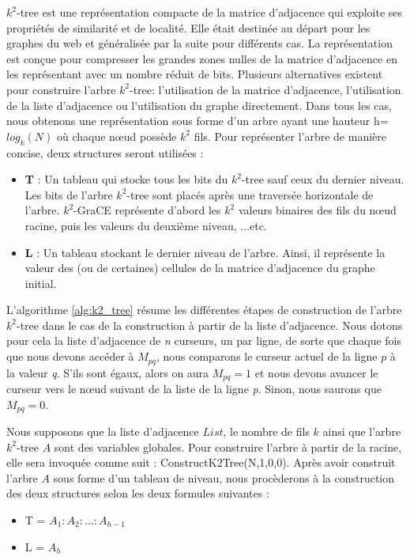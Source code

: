 \documentclass[a4paper,oneside,12pt]{report}
\theoremstyle{definition}
\begin{document}
			$k^2$-tree est une représentation compacte de la matrice d'adjacence qui exploite ses propriétés de similarité et de localité. Elle était destinée au départ pour les graphes du web et généralisée par la suite pour différents cas. La représentation est conçue pour compresser les grandes zones nulles de la matrice d'adjacence en les représentant avec un nombre réduit de bits. Plusieurs alternatives existent pour construire l'arbre $k^2$-tree: l'utilisation de la matrice d'adjacence, l'utilisation de la liste d'adjacence ou l'utilisation du graphe directement. Dans tous les cas, nous obtenons une représentation sous forme d'un arbre ayant une hauteur h= $log_k(N)$ où chaque nœud possède $k^2$ fils. 
			  Pour représenter l'arbre de manière concise, deux structures seront utilisées :
			\begin{itemize}
			\item \textbf{T }: Un tableau qui stocke tous les bits du $k^2$-tree sauf ceux du dernier niveau. Les bits de l'arbre $k^2$-tree sont placés après une traversée horizontale de l'arbre. $k^2$-GraCE représente d'abord les $k^2$ valeurs binaires des fils du nœud racine, puis les valeurs du deuxième niveau, ...etc.
			
			\item  \textbf{L} : Un tableau stockant le dernier niveau de l'arbre. Ainsi, il représente la valeur des (ou de certaines) cellules de la matrice d'adjacence du graphe initial.
			\end{itemize}
			
			L'algorithme \ref{alg:k2_tree} résume les différentes étapes de construction de l'arbre $k^2$-tree dans le cas de la construction à partir de la liste d'adjacence. Nous dotons pour cela la liste d'adjacence de \textit{n} curseurs, un par ligne, de sorte que chaque fois que nous devons accéder à $M_{pq}$, nous comparons le curseur actuel de la ligne $p$ à la valeur \textit{q}. S'ils sont égaux, alors on aura $M_{pq} = 1$ et nous devons avancer le curseur vers le nœud suivant de la liste de la ligne \textit{p}. Sinon, nous saurons que $M_{pq} = 0$. 
			
			Nous supposons que la liste d'adjacence $List$, le nombre de fils $k$ ainsi que l'arbre $k^2$-tree $A$ sont des variables globales. Pour construire l'arbre à partir de la racine, elle sera invoquée comme suit :  ConstructK2Tree(N,1,0,0). Après avoir construit l'arbre $A$ sous forme d'un tableau de niveau, nous procèderons à la construction des deux structures selon les deux formules suivantes :
			\begin{itemize}[label=$\bullet$]
			 	\item T = $A_1: A_2:. . . :A_{h-1}$
			 	\item L = $A_h$
			\end{itemize}	
\end{document}
